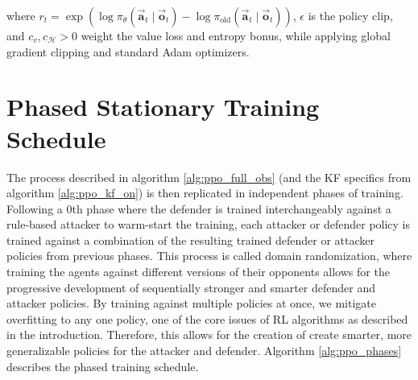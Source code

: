 where \(r_t=\exp\!\left(\log\pi_\theta(\vec{\mathbf{a}}_t \mid \vec{\mathbf{o}}_t)-\log\pi_{\mathrm{old}}(\vec{\mathbf{a}}_t \mid \vec{\mathbf{o}}_t)\right)\),
\(\epsilon\) is the policy clip, and \(c_v,c_{\mathcal{H}}>0\) weight the value loss and entropy bonus, while applying global gradient clipping and standard Adam optimizers.


\section{Phased Stationary Training Schedule}

The process described in algorithm \ref{alg:ppo_full_obs} (and the KF specifics from algorithm \ref{alg:ppo_kf_on}) is then replicated in independent phases of training. Following a 0th phase where the defender is trained interchangeably against a rule-based attacker to warm-start the training, each attacker or defender policy is trained against a combination of the resulting trained defender or attacker policies from previous phases. This process is called domain randomization, where training the agents against different versions of their opponents allows for the progressive development of sequentially stronger and smarter defender and attacker policies. By training against multiple policies at once, we mitigate overfitting to any one policy, one of the core issues of RL algorithms as described in the introduction. Therefore, this allows for the creation of create smarter, more generalizable policies  for the attacker and defender. Algorithm \ref{alg:ppo_phases} describes the phased training schedule.



